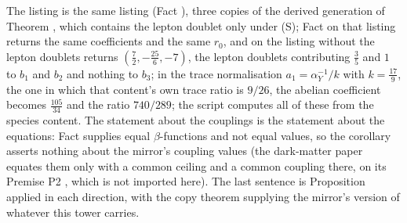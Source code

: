 The listing is the same listing (Fact ), three copies of the derived generation of Theorem , which contains the lepton doublet only under (S); Fact  on that listing returns the same coefficients and the same $r_{0}$, and on the listing without the lepton doublets returns $(\tfrac72, -\tfrac{25}{6}, -7)$, the lepton doublets contributing $\tfrac35$ and $1$ to $b_{1}$ and $b_{2}$ and nothing to $b_{3}$; in the trace normalisation $a_{1} = \alpha_{Y}^{-1}/k$ with $k = \tfrac{17}{9}$, the one in which that content's own trace ratio is $9/26$, the abelian coefficient becomes $\tfrac{105}{34}$ and the ratio $740/289$; the script computes all of these from the species content. The statement about the couplings is the statement about the equations: Fact  supplies equal $\beta$-functions and not equal values, so the corollary asserts nothing about the mirror's coupling values (the dark-matter paper equates them only with a common ceiling and a common coupling there, on its Premise P2 \cite[Thm.~4.3(iii),(iv)]{ButlerT14}, which is not imported here). The last sentence is Proposition  applied in each direction, with the copy theorem supplying the mirror's version of whatever this tower carries.
